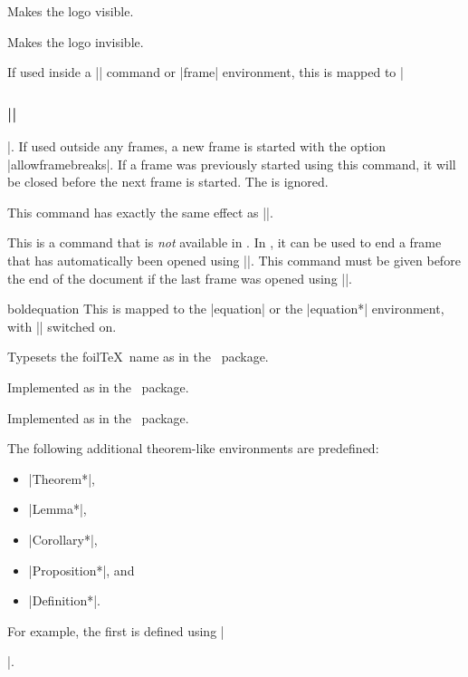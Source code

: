 \begin{command}{\LogoOn}
  Makes the logo visible.
\end{command}

\begin{command}{\LogoOff}
  Makes the logo invisible.
\end{command}

\begin{command}{\foilhead{}}
  If used inside a |\frame| command or |frame| environment, this is mapped to |\frametitle{||}|. If used outside any frames, a new frame is started with the option |allowframebreaks|. If a frame was previously started using this command, it will be closed before the next frame is started. The  is ignored.
\end{command}

\begin{command}{\rotatefoilhead{}}
  This command has exactly the same effect as |\foilhead|.
\end{command}

\begin{command}{\endfoil}
  This is a command that is \emph{not} available in \foils. In \beamer, it can be used to end a frame that has automatically been opened using |\foildhead|. This command must be given before the end of the document if the last frame was opened using |\foildhead|.
\end{command}

\begin{environment}{{boldequation}\opt{|*|}}
  This is mapped to the |equation| or the |equation*| environment, with |\boldmath| switched on.
\end{environment}

\begin{command}{\FoilTeX}
  Typesets the foil\TeX\ name as in the \foils\ package.
\end{command}

\begin{command}{\bm{}}
  Implemented as in the \foils\ package.
\end{command}

\begin{command}{\bmstyle{}}
  Implemented as in the \foils\ package.
\end{command}

The following additional theorem-like environments are predefined:
\begin{itemize}
\item |Theorem*|,
\item |Lemma*|,
\item |Corollary*|,
\item |Proposition*|, and
\item |Definition*|.
\end{itemize}
For example, the first is defined using |\newtheorem*{Theorem*}{Theorem}|.

